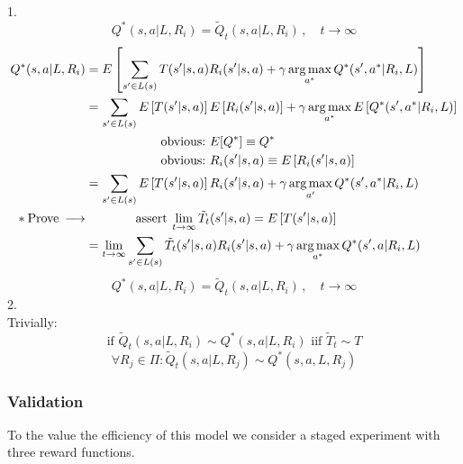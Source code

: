 1.\\
\begin{equation}
Q^{\ast}( s, a | L, R_i ) = \tilde{Q}_t( s, a | L, R_i )\,,\quad t \to \infty
\end{equation}
\begin{align}
Q^{\ast}( s, a | L, R_i ) & = E\left[ \sum_{s^{\prime} \in L( s )} T( s^{\prime} | s, a ) R_i( s^{\prime} | s, a ) + \gamma \operatorname*{arg\,max}_{a^{\ast}} Q^{\ast}( s^{\prime}, a^{\ast} | R_i, L ) \right] \\
& = \sum_{s^{\prime} \in L( s )} E\left[ T( s^{\prime} | s, a ) \right] E\left[ R_i( s^{\prime} | s, a ) \right] + \gamma \operatorname*{arg\,max}_{a^{\ast}} E\left[ Q^{\ast}( s^{\prime}, a^{\ast} | R_i, L ) \right] \\
& \qquad \qquad \qquad \text{obvious:\ }E[ Q^{\ast} ] \equiv Q^{\ast} \nonumber \\
& \qquad \qquad \qquad \text{obvious:\ }R_i( s^{\prime} | s, a ) \equiv E\left[ R_i( s^{\prime} | s, a ) \right] \nonumber \\
& = \sum_{s^{\prime} \in L(s)} E\left[ T( s^{\prime} | s, a ) \right] R_i( s^{\prime} | s, a ) + \gamma \operatorname*{arg\,max}_{a^{\prime}} Q^{\ast}( s^{\prime}, a^{\ast} | R_i, L ) \\
\ast\:\text{Prove}\:\longrightarrow & \qquad \qquad \text{assert}\:\lim_{t \to \infty} \tilde{T}_t( s^{\prime} | s, a ) = E\left[ T( s^{\prime} | s, a ) \right] \nonumber \\
& = \lim_{t \to \infty} \sum_{s^{\prime} \in L( s )} \tilde{T}_t( s^\prime | s, a ) R_i( s^\prime | s, a ) + \gamma \operatorname*{arg\,max}_{a^{\ast}} Q^{\ast}( s^{\prime}, a | R_i, L )
\end{align}
\begin{equation}
Q^{\ast}( s, a | L, R_i ) = \tilde{Q}_{t}( s, a | L, R_i )\,,\quad t \to \infty
\end{equation}
2.\\
Trivially: 
\begin{equation}
\text{if\ }\tilde{Q}_{t}( s, a | L, R_i ) \sim Q^{\ast}( s, a | L, R_i ) \text{\ iif\ }\tilde{T}_t \sim T
\end{equation}
\begin{equation}
\forall R_j \in \Pi: \tilde{Q}_t( s, a | L, R_j) \sim Q^{\ast}( s, a, L, R_j )
\end{equation}

\subsubsection{Validation}
To the value the efficiency of this model we consider a staged experiment with three reward functions.

